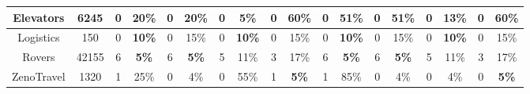 \documentclass{article}
\theoremstyle{remark}
\begin{document}
{\begin{table}[ht]
{\begin{tabular}{|c|c|c|c|c|c|c|c|c|c|c|c|c|c|c|c|c|c|}
Elevators                        & 6245                            & 0                & 20\%            & 0                & 20\%            & 0                & \textbf{5\%}    & 0                & 60\%            & 0                & 51\%            & 0                & 51\%            & 0                & \textbf{13\%}   & 0                & 60\%            \\ \hline
Logistics                        & 150                             & 0                & \textbf{10\%}   & 0                & 15\%            & 0                & \textbf{10\%}   & 0                & 15\%            & 0                & \textbf{10\%}   & 0                & 15\%            & 0                & \textbf{10\%}   & 0                & 15\%            \\ \hline
Rovers                           & 42155                           & 6                & \textbf{5\%}    & 6                & \textbf{5\%}    & 5                & 11\%            & 3                & 17\%            & 6                & \textbf{5\%}    & 6                & \textbf{5\%}    & 5                & 11\%            & 3                & 17\%            \\ \hline
ZenoTravel                       & 1320                            & 1                & 25\%            & 0                & 4\%             & 0                & 55\%            & 1                & \textbf{5\%}    & 1                & 85\%            & 0                & 4\%             & 0                & 4\%             & 0                & \textbf{5\%}    \\ \hline
\end{tabular}
}
\end{table}
}
\end{document}
